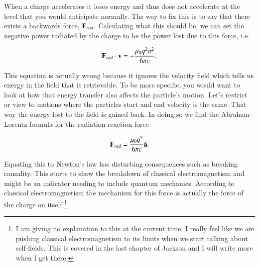 \documentclass[preprint, review,12pt]{elsarticle}
\def\.{\cdot}
\def\b{\textbf}
\begin{document}
When a charge accelerates it loses energy and thus does not accelerate at the level that you would anticipate normally. The way to fix this is to say that there exists a backwards force, $\b F_{rad}$. Calculating what this should be, we can set the negative power radiated by the charge to be the power lost due to this force, i.e.

\begin{equation}
    \b F_{rad} \. \b v = - \frac{\mu_0 q^2 a^2}{6 \pi c}.
\end{equation}
 
This equation is actually wrong because it ignores the velocity field which tells us energy in the field that is retrievable. To be more specific, you would want to look at how that energy transfer also affects the particle's motion. Let's restrict or view to motions where the particles start and end velocity is the same. That way the energy lost to the field is gained back. In doing so we find the Abraham-Lorentz formula for the radiation reaction force

\begin{equation}
    \b F_{rad} = \frac{\mu_0 q^2}{6 \pi c} \dot{\b a}.
\end{equation}

Equating this to Newton's law has disturbing consequences such as breaking causality. This starts to show the breakdown of classical electromagnetism and might be an indicator needing to include quantum mechanics. According to classical electromagnetism the mechanism for this force is actually the force of the charge on itself.\footnote{I am giving no explanation to this at the current time. I really feel like we are pushing classical electromagnetism to its limits when we start talking about self-fields. This is covered in the last chapter of Jackson and I will write more when I get there.}













\end{document}
